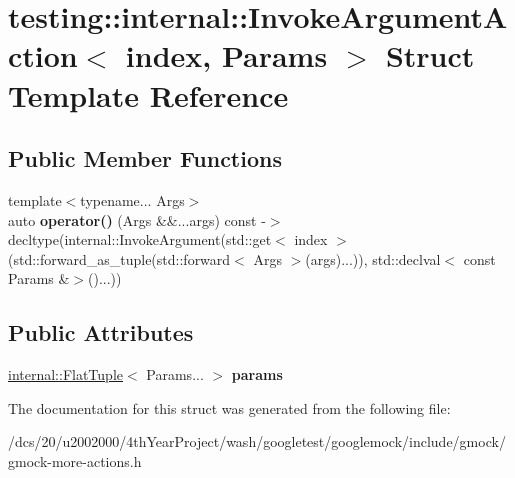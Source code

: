 \hypertarget{structtesting_1_1internal_1_1InvokeArgumentAction}{}\section{testing\+:\+:internal\+:\+:Invoke\+Argument\+Action$<$ index, Params $>$ Struct Template Reference}
\label{structtesting_1_1internal_1_1InvokeArgumentAction}
\subsection*{Public Member Functions}
\begin{DoxyCompactItemize}
\item 
\mbox{\label{structtesting_1_1internal_1_1InvokeArgumentAction_ad0788a33c96f95025a6243d91160eb04}} 
{\footnotesize template$<$typename... Args$>$ }\\auto {\bfseries operator()} (Args \&\&...args) const -\/$>$ decltype(internal\+::\+Invoke\+Argument(std\+::get$<$ index $>$(std\+::forward\+\_\+as\+\_\+tuple(std\+::forward$<$ Args $>$(args)...)), std\+::declval$<$ const Params \&$>$()...))
\end{DoxyCompactItemize}
\subsection*{Public Attributes}
\begin{DoxyCompactItemize}
\item 
\mbox{\label{structtesting_1_1internal_1_1InvokeArgumentAction_a7f5d847630b6bfc6474da4d174b30bd3}} 
\mbox{\hyperlink{classtesting_1_1internal_1_1FlatTuple}{internal\+::\+Flat\+Tuple}}$<$ Params... $>$ {\bfseries params}
\end{DoxyCompactItemize}


The documentation for this struct was generated from the following file\+:\begin{DoxyCompactItemize}
\item 
/dcs/20/u2002000/4th\+Year\+Project/wash/googletest/googlemock/include/gmock/gmock-\/more-\/actions.\+h\end{DoxyCompactItemize}
